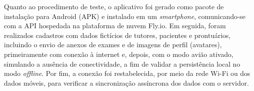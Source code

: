 Quanto ao procedimento de teste, o aplicativo foi gerado como pacote de instalação para Android (APK) e instalado em um \textit{smartphone}, comunicando-se com a API hospedada na plataforma de nuvem Fly.io. Em seguida, foram realizados cadastros com dados fictícios de tutores, pacientes e prontuários, incluindo o envio de anexos de exames e de imagens de perfil (avatares), primeiramente com conexão à internet e, depois, com o modo avião ativado, simulando a ausência de conectividade, a fim de validar a persistência local no modo \textit{offline}. Por fim, a conexão foi restabelecida, por meio da rede Wi-Fi ou dos dados móveis, para verificar a sincronização assíncrona dos dados com o servidor.